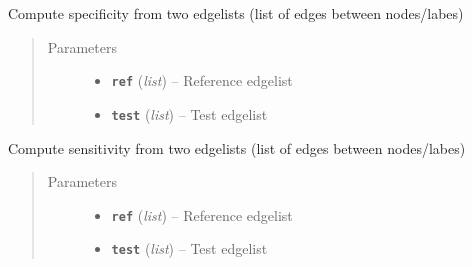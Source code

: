 \documentclass[letterpaper,10pt,english]{sphinxmanual}
\begin{document}

\begin{fulllineitems}
\label{Doc:Moduler.Specificity}
Compute specificity from two edgelists (list of edges between nodes/labes)
\begin{quote}\begin{description}
\item[{Parameters}] \leavevmode\begin{itemize}
\item {} 
\textbf{\texttt{ref}} (\emph{list}) -- Reference edgelist

\item {} 
\textbf{\texttt{test}} (\emph{list}) -- Test edgelist

\end{itemize}

\end{description}\end{quote}

\end{fulllineitems}


\begin{fulllineitems}
\label{Doc:Moduler.Sensitivity}
Compute sensitivity from two edgelists (list of edges between nodes/labes)
\begin{quote}\begin{description}
\item[{Parameters}] \leavevmode\begin{itemize}
\item {} 
\textbf{\texttt{ref}} (\emph{list}) -- Reference edgelist

\item {} 
\textbf{\texttt{test}} (\emph{list}) -- Test edgelist

\end{itemize}

\end{description}\end{quote}

\end{fulllineitems}

\end{document}
